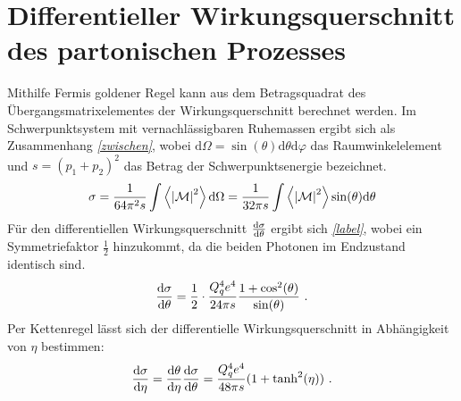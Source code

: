 \section{Differentieller Wirkungsquerschnitt des partonischen Prozesses}
Mithilfe Fermis goldener Regel kann aus dem Betragsquadrat des Übergangsmatrixelementes der Wirkungsquerschnitt berechnet werden.
Im Schwerpunktsystem mit vernachlässigbaren Ruhemassen ergibt sich als Zusammenhang \textit{\autoref{zwischen}}, wobei $\text{d}\Omega = \sin(\theta)\text{d}\theta\text{d}\varphi$ das Raumwinkelelement und $s = (p_1 + p_2)^2$ das Betrag der Schwerpunktsenergie bezeichnet.
\begin{equation}
\sigma = \frac{1}{64\pi^2s} \int \left\langle  \abs{\mathcal{M}}^2\right\rangle \text{d}\Omega = \frac{1}{32\pi s} \int \left\langle  \abs{\mathcal{M}}^2\right\rangle \sin(\theta) \text{d}\theta
\end{equation}
Für den differentiellen Wirkungsquerschnitt $\derivative{\sigma}{\theta}$ ergibt sich \textit{\autoref{label}}, wobei ein Symmetriefaktor $\frac{1}{2}$ hinzukommt, da die beiden Photonen im Endzustand identisch sind.
\begin{equation}
\derivative{\sigma}{\theta} = \frac{1}{2} \cdot \frac{Q_q^4e^4}{24\pi s}\frac{1+\cos^2(\theta)}{\sin(\theta)} ~.
\end{equation}
Per Kettenregel lässt sich der differentielle Wirkungsquerschnitt in Abhängigkeit von $\eta$ bestimmen:
\begin{equation}
\derivative{\sigma}{\eta} =\derivative{\theta}{\eta}\derivative{\sigma}{\theta} =  \frac{Q_q^4e^4}{48\pi s}(1+\tanh^2(\eta))~.
\end{equation}
